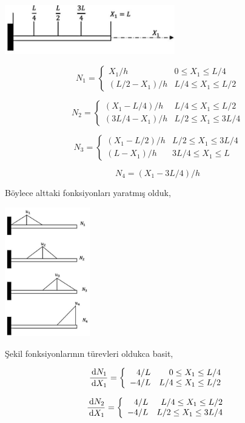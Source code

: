 \documentclass[12pt,fleqn]{article}\usepackage{../../common}
\begin{document}
\includegraphics[width=20em]{compscieng_bpp45fem2_10.jpg}

$$
N_1 = \left\{ \begin{array}{rr}
X_1 / h & 0 \le X_1 \le L/4 \\
(L/2 - X_1) / h & L/4 \le X_1 \le L/2
\end{array} \right.
$$

$$
N_2 = \left\{ \begin{array}{rr}
(X_1 - L/4)/h & L/4 \le X_1 \le L/2 \\
(3L/4 - X_1)/h & L/2 \le X_1 \le 3L/4
\end{array} \right.
$$

$$
N_3 = \left\{ \begin{array}{rr}
(X_1-L/2)/h & L/2 \le X_1 \le 3L/4 \\
(L-X_1)/h & 3L/4 \le X_1 \le L
\end{array} \right.
$$

$$
N_4 = (X_1 - 3L/4) / h
$$

Böylece alttaki fonksiyonları yaratmış olduk,

\includegraphics[width=10em]{compscieng_bpp45fem2_11.jpg}

Şekil fonksiyonlarının türevleri oldukca basit,

$$
\frac{\,\mathrm{d} N_1}{\,\mathrm{d} X_1} = \left\{ \begin{array}{rr}
4/L   & 0 \le X_1 \le L/4 \\
-4/L  & L/4 \le X_1 \le L/2
\end{array} \right.
$$

$$
\frac{\,\mathrm{d} N_2}{\,\mathrm{d} X_1} = \left\{ \begin{array}{rr}
4/L  & L/4 \le X_1 \le L/2 \\
-4/L & L/2 \le X_1 \le 3L/4
\end{array} \right.
$$
\end{document}

